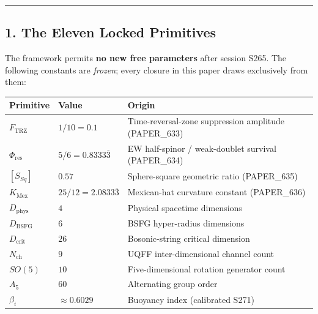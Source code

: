 \documentclass[
]{article}
\newcounter{none}
\begin{document}
\begin{center}\rule{0.5\linewidth}{0.5pt}\end{center}

\subsection{1. The Eleven Locked
Primitives}\label{the-eleven-locked-primitives}

The framework permits \textbf{no new free parameters} after session
S265. The following constants are \emph{frozen}; every closure in this
paper draws exclusively from them:

{\def\LTcaptype{none}
\begin{longtable}[]{@{}
  >{\raggedright\arraybackslash}p{}
  >{\raggedright\arraybackslash}p{}
  >{\raggedright\arraybackslash}p{}@{}}
\toprule\noalign{}
\begin{minipage}[b]{\linewidth}\raggedright
Primitive
\end{minipage} & \begin{minipage}[b]{\linewidth}\raggedright
Value
\end{minipage} & \begin{minipage}[b]{\linewidth}\raggedright
Origin
\end{minipage} \\
\midrule\noalign{}
\endhead
\bottomrule\noalign{}
\endlastfoot
\(F_{\text{TRZ}}\) & \(1/10 = 0.1\) & Time-reversal-zone suppression
amplitude (PAPER\_633) \\
\(\Phi_{\text{res}}\) & \(5/6 = 0.8333\overline{3}\) & EW half-spinor /
weak-doublet survival (PAPER\_634) \\
\([S_{Sq}]\) & \(0.57\) & Sphere-square geometric ratio (PAPER\_635) \\
\(K_{\text{Mex}}\) & \(25/12 = 2.0833\overline{3}\) & Mexican-hat
curvature constant (PAPER\_636) \\
\(D_{\text{phys}}\) & \(4\) & Physical spacetime dimensions \\
\(D_{\text{BSFG}}\) & \(6\) & BSFG hyper-radius dimensions \\
\(D_{\text{crit}}\) & \(26\) & Bosonic-string critical dimension \\
\(N_{\text{ch}}\) & \(9\) & UQFF inter-dimensional channel count \\
\(SO(5)\) & \(10\) & Five-dimensional rotation generator count \\
\(A_5\) & \(60\) & Alternating group order \\
\(\beta_i\) & \(\approx 0.6029\) & Buoyancy index (calibrated S271) \\
\end{longtable}
}
\end{document}
